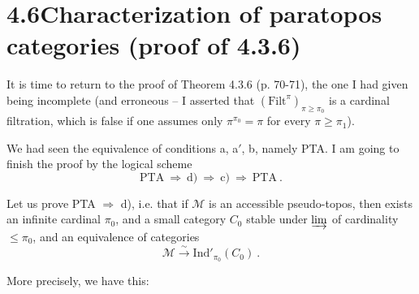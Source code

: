 \documentclass[11pt]{article}
\newcommand{\printedpage}[1]{\marginpar{\footnotesize p.~#1}}
\newcommand{\msp}[1]{\marginpar{\footnotesize [#1]}}
\newcommand{\Ind}{\mathrm{Ind}}
\begin{document}
\printedpage{44}

\msp{page 139}

\section*{4.6\quad Characterization of paratopos categories (proof of 4.3.6)}

It is time to return to the proof of Theorem 4.3.6 (p. 70-71), the one I had given being incomplete (and erroneous – I asserted that $(\mathrm{Filt}^{\pi})_{\pi\geqslant\pi_0}$ is a cardinal filtration, which is false if one assumes only $\pi^{\pi_0}=\pi$ for every $\pi\geqslant\pi_1$).

We had seen the equivalence of conditions a, a$'$, b, namely PTA. I am going to finish the proof by the logical scheme
\[
\text{PTA} \ \Longrightarrow\ \text{d)} \ \Longrightarrow\ \text{c)} \ \Longrightarrow\ \text{PTA}\ . \tag*{$(*)$}
\]

Let us prove PTA $\Longrightarrow$ d), i.e. that if $\mathcal{M}$ is an accessible pseudo-topos, then exists an infinite cardinal $\pi_0$, and a small category $C_0$ stable under $\varinjlim$ of cardinality $\leqslant\pi_0$, and an equivalence of categories %
\[
\mathcal{M} \xrightarrow{\ \sim\ } \Ind'_{\pi_0}(C_0)\ . \tag*{(4.6.1)}
\]

More precisely, we have this:
\end{document}
